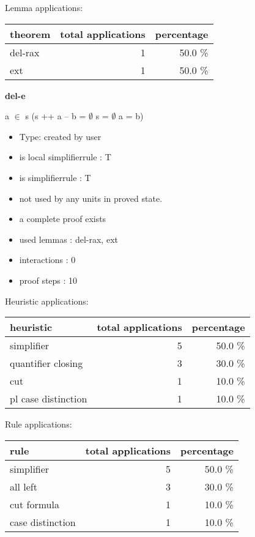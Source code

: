 \documentclass[a4paper]{article}
\begin{document}
Lemma applications:

\begin{supertabular}{l|r|r}
theorem	        & total applications & percentage \\ \hline
del-rax & 1 & 50.0 \% \\
ext & 1 & 50.0 \% \\

\end{supertabular}
\pagebreak

{\LARGE\bf del-e}\label{lemma-del-e}

\medskip

 \Fol \Not a $\in$ s \Imp (s ++ a -- b = $\emptyset$ \Equiv s = $\emptyset$ \And a = b)

\begin{itemize}

\item Type: created by user

\item is local simplifierrule : T
\item is simplifierrule : T
\item not used by any units in proved state.
\item       a complete proof exists
\item       used lemmas  : del-rax, ext
\item       interactions : 0
\item       proof steps  : 10
\end{itemize}

\medskip


Heuristic applications:

\begin{supertabular}{l|r|r}
heuristic	& total applications & percentage \\ \hline
simplifier & 5 & 50.0 \% \\
quantifier closing & 3 & 30.0 \% \\
cut & 1 & 10.0 \% \\
pl case distinction & 1 & 10.0 \% \\

\end{supertabular}

Rule applications:

\begin{supertabular}{l|r|r}
rule	        & total applications & percentage \\ \hline
simplifier & 5 & 50.0 \% \\
all left & 3 & 30.0 \% \\
cut formula & 1 & 10.0 \% \\
case distinction & 1 & 10.0 \% \\

\end{supertabular}
\end{document}
